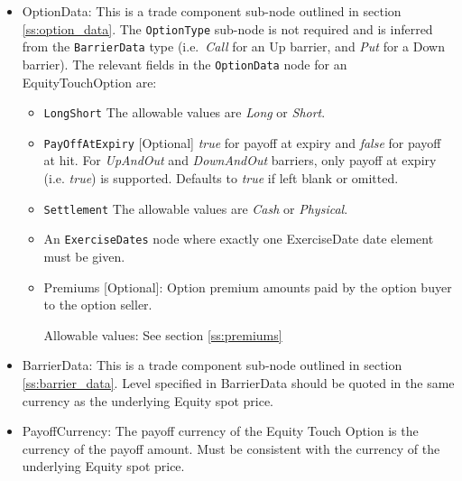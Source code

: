 \begin{itemize}

\item OptionData: This is a trade component sub-node outlined in section \ref{ss:option_data}. The \lstinline!OptionType! sub-node
is not required and is inferred from the \lstinline!BarrierData! type (i.e.\ \emph{Call} for an Up barrier, and \emph{Put} for a Down barrier).
The relevant fields in the \lstinline!OptionData! node for an EquityTouchOption are:
	
	\begin{itemize}
	\item \lstinline!LongShort! The allowable values are \emph{Long} or \emph{Short}.

	
	\item  \lstinline!PayOffAtExpiry! [Optional] \emph{true} for payoff at expiry and \emph{false} for payoff at hit. For  \emph{UpAndOut} and \emph{DownAndOut} barriers, only payoff at expiry (i.e. \emph{true}) is supported. Defaults to  \emph{true} if left blank or omitted.
	
	\item  \lstinline!Settlement! The allowable values are \emph{Cash} or \emph{Physical}.
	
	\item An \lstinline!ExerciseDates! node where exactly one ExerciseDate date element must be given. 
	
    \item Premiums [Optional]: Option premium amounts paid by the option buyer to the option seller.

      Allowable values:  See section \ref{ss:premiums}

	\end{itemize}

\item BarrierData: This is a trade component sub-node outlined in section \ref{ss:barrier_data}.
Level specified in BarrierData should be quoted in the same currency as the underlying Equity spot price.

\item PayoffCurrency: The payoff currency of the Equity Touch Option is the currency of the payoff amount. Must be consistent with the currency of the underlying Equity spot price.   


\end{itemize}
